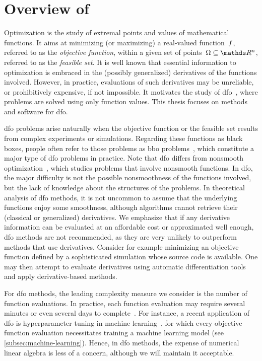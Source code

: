 \section{Overview of }

Optimization is the study of extremal points and values of mathematical functions.
It aims at minimizing (or maximizing) a real-valued function~$f$, referred to as the \emph{objective function}, within a given set of points~$\Omega \subseteq \R^n$, referred to as the \emph{feasible set}.
It is well known that essential information to optimization is embraced in the (possibly generalized) derivatives of the functions involved.
However, in practice, evaluations of such derivatives may be unreliable, or prohibitively expensive, if not impossible.
It motivates the study of \gls{dfo}~\cite{Conn_Scheinberg_Vicente_2009b,Audet_Hare_2017,Custodio_Scheinberg_Vicente_2017,Larson_Menickelly_Wild_2019}, where problems are solved using only function values.
This thesis focuses on methods and software for \gls{dfo}.

\Gls{dfo} problems arise naturally when the objective function or the feasible set results from complex experiments or simulations.
Regarding these functions as black boxes, people often refer to those problems as \gls{bbo} problems~\cite{Audet_Hare_2017}, which constitute a major type of \gls{dfo} problems in practice.
Note that \gls{dfo} differs from nonsmooth optimization~\cite{Clark_1983,Cui_Pang_2021}, which studies problems that involve nonsmooth functions.
In \gls{dfo}, the major difficulty is not the possible nonsmoothness of the functions involved, but the lack of knowledge about the structures of the problems.
In theoretical analysis of \gls{dfo} methods, it is not uncommon to assume that the underlying functions enjoy some smoothness, although algorithms cannot retrieve their (classical or generalized) derivatives.
We emphasize that if any derivative information can be evaluated at an affordable cost or approximated well enough, \gls{dfo} methods are not recommended, as they are very unlikely to outperform methods that use derivatives.
Consider for example minimizing an objective function defined by a sophisticated simulation whose source code is available.
One may then attempt to evaluate derivatives using automatic differentiation tools~\cite{Griewank_2003,Griewank_Walther_2008} and apply derivative-based methods.

For \gls{dfo} methods, the leading complexity measure we consider is the number of function evaluations.
In practice, each function evaluation may require several minutes or even several days to complete~\cite[\S~1.4]{Audet_Hare_2017}.
For instance, a recent application of \gls{dfo} is hyperparameter tuning in machine learning~\cite{Ghanbari_Scheinberg_2017}, for which every objective function evaluation necessitates training a machine learning model (see \cref{subsec:machine-learning}).
Hence, in \gls{dfo} methods, the expense of numerical linear algebra is less of a concern, although we will maintain it acceptable.

